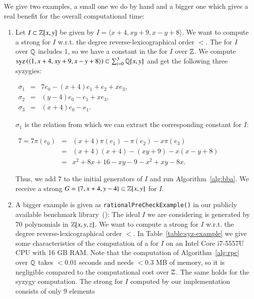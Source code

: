 \begin{example}
\label{ex:syz-example}
We give two examples, a small one we do by hand and a bigger one which gives a
real benefit for the overall computational time:
\begin{enumerate}
\item Let $I \subset \mathbb{Z}[x,y]$ be given by $I=\langle x+4, xy+9, x-y+8\rangle$.
We want to compute a strong \stb for $I$ w.r.t. the degree reverse-lexicographical
order $<$. The \stb for $I$ over $\mathbb{Q}$ includes $1$, so we have a constant in the
\stb for $I$ over $\mathbb{Z}$. We compute $\mathrm{syz}\left({\langle 1, x+4, xy+9, x-y+8\rangle}\right)
\subset \sum_{i=0}^3 \mathbb{Q}[x,y]$ and get the following three syzygies:
\begin{center}
$
\begin{array}{rcl}
\sigma_1 & = & 7 e_0 - (x+4) e_1 + e_2 + x e_3,\\
\sigma_2 & = & (y-4) e_0 - e_1 + x e_3,\\
\sigma_3 & = & (x+4) e_0 - e_1.
\end{array}
$
\end{center}
$\sigma_1$ is the relation from which we can extract the corresponding constant
for $I$:
\begin{center}
$
\begin{array}{rcl}
7 = 7 \pi(e_0) &=& (x+4) \pi(e_1) - \pi(e_2) - x \pi(e_3)\\
  &=& (x+4)(x+4) - (xy+9) - x(x-y+8)\\
  &=& x^2+8x+16 - xy -9 - x^2 + xy -8x.
\end{array}
$
\end{center}
Thus, we add $7$ to the initial generators of $I$ and run
Algorithm~\ref{alg:bba}. We receive a strong \stb $G = \{7, x+4, y-4\} \subset
\mathbb{Z}[x,y]$ for $I$.
\item A bigger example is given as \texttt{rationalPreCheckExample()} in our
publicly available benchmark library~(\cite{singular-benchmarks}): The ideal $I$
we are considering is generated by $70$ polynomials in $\mathbb{Z}[x,y,z]$. We want to
compute a strong \stb for $I$ w.r.t. the degree reverse-lexicographical order $<$.
In Table~\ref{table:syz-example} we give some characteristics of the computation
of a \stb for $I$ on an Intel Core
i7-5557U CPU with 16 GB RAM. Note that the computation of
Algorithm~\ref{alg:rpc} over $\mathbb{Q}$ takes $<0.01$ seconds and needs $<0.3$ MB of
memory, so it is
negligible compared to the computational cost over $\mathbb{Z}$. The same holds for
the syzygy computation. The strong \stb for $I$ computed by
our implementation consists of only $9$ elements

\end{enumerate}
\end{example}
